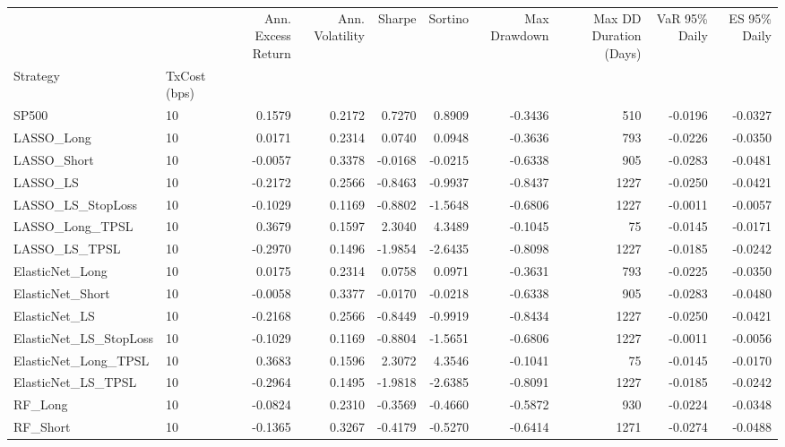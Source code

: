 \begin{tabular}{llrrrrrrrr}
\toprule
 &  & Ann. Excess Return & Ann. Volatility & Sharpe & Sortino & Max Drawdown & Max DD Duration (Days) & VaR 95\% Daily & ES 95\% Daily \\
Strategy & TxCost (bps) &  &  &  &  &  &  &  &  \\
\midrule
SP500 & 10 & 0.1579 & 0.2172 & 0.7270 & 0.8909 & -0.3436 & 510 & -0.0196 & -0.0327 \\
\cline{1-10}
LASSO\_Long & 10 & 0.0171 & 0.2314 & 0.0740 & 0.0948 & -0.3636 & 793 & -0.0226 & -0.0350 \\
\cline{1-10}
LASSO\_Short & 10 & -0.0057 & 0.3378 & -0.0168 & -0.0215 & -0.6338 & 905 & -0.0283 & -0.0481 \\
\cline{1-10}
LASSO\_LS & 10 & -0.2172 & 0.2566 & -0.8463 & -0.9937 & -0.8437 & 1227 & -0.0250 & -0.0421 \\
\cline{1-10}
LASSO\_LS\_StopLoss & 10 & -0.1029 & 0.1169 & -0.8802 & -1.5648 & -0.6806 & 1227 & -0.0011 & -0.0057 \\
\cline{1-10}
LASSO\_Long\_TPSL & 10 & 0.3679 & 0.1597 & 2.3040 & 4.3489 & -0.1045 & 75 & -0.0145 & -0.0171 \\
\cline{1-10}
LASSO\_LS\_TPSL & 10 & -0.2970 & 0.1496 & -1.9854 & -2.6435 & -0.8098 & 1227 & -0.0185 & -0.0242 \\
\cline{1-10}
ElasticNet\_Long & 10 & 0.0175 & 0.2314 & 0.0758 & 0.0971 & -0.3631 & 793 & -0.0225 & -0.0350 \\
\cline{1-10}
ElasticNet\_Short & 10 & -0.0058 & 0.3377 & -0.0170 & -0.0218 & -0.6338 & 905 & -0.0283 & -0.0480 \\
\cline{1-10}
ElasticNet\_LS & 10 & -0.2168 & 0.2566 & -0.8449 & -0.9919 & -0.8434 & 1227 & -0.0250 & -0.0421 \\
\cline{1-10}
ElasticNet\_LS\_StopLoss & 10 & -0.1029 & 0.1169 & -0.8804 & -1.5651 & -0.6806 & 1227 & -0.0011 & -0.0056 \\
\cline{1-10}
ElasticNet\_Long\_TPSL & 10 & 0.3683 & 0.1596 & 2.3072 & 4.3546 & -0.1041 & 75 & -0.0145 & -0.0170 \\
\cline{1-10}
ElasticNet\_LS\_TPSL & 10 & -0.2964 & 0.1495 & -1.9818 & -2.6385 & -0.8091 & 1227 & -0.0185 & -0.0242 \\
\cline{1-10}
RF\_Long & 10 & -0.0824 & 0.2310 & -0.3569 & -0.4660 & -0.5872 & 930 & -0.0224 & -0.0348 \\
\cline{1-10}
RF\_Short & 10 & -0.1365 & 0.3267 & -0.4179 & -0.5270 & -0.6414 & 1271 & -0.0274 & -0.0488 \\

\end{tabular}
